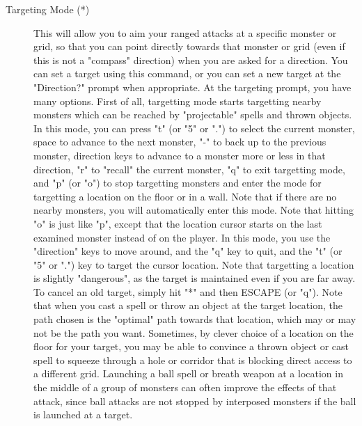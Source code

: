 \begin{description}
\item[Targeting Mode (*)]
  This will allow you to aim your ranged attacks at a specific monster or
  grid, so that you can point directly towards that monster or grid (even
  if this is not a "compass" direction) when you are asked for a
  direction. You can set a target using this command, or you can set a new
  target at the "Direction?" prompt when appropriate. At the targeting
  prompt, you have many options. First of all, targetting mode starts
  targetting nearby monsters which can be reached by "projectable" spells
  and thrown objects. In this mode, you can press "t" (or "5" or ".") to
  select the current monster, space to advance to the next monster, "-" to
  back up to the previous monster, direction keys to advance to a monster
  more or less in that direction, "r" to "recall" the current monster, "q"
  to exit targetting mode, and "p" (or "o") to stop targetting monsters
  and enter the mode for targetting a location on the floor or in a
  wall. Note that if there are no nearby monsters, you will automatically
  enter this mode.  Note that hitting "o" is just like "p", except that
  the location cursor starts on the last examined monster instead of on
  the player.  In this mode, you use the "direction" keys to move around,
  and the "q" key to quit, and the "t" (or "5" or ".") key to target the
  cursor location. Note that targetting a location is slightly
  "dangerous", as the target is maintained even if you are far away. To
  cancel an old target, simply hit "*" and then ESCAPE (or "q"). Note that
  when you cast a spell or throw an object at the target location, the
  path chosen is the "optimal" path towards that location, which may or
  may not be the path you want.  Sometimes, by clever choice of a location
  on the floor for your target, you may be able to convince a thrown
  object or cast spell to squeeze through a hole or corridor that is
  blocking direct access to a different grid. Launching a ball spell or
  breath weapon at a location in the middle of a group of monsters can
  often improve the effects of that attack, since ball attacks are not
  stopped by interposed monsters if the ball is launched at a target.
\end{description}

